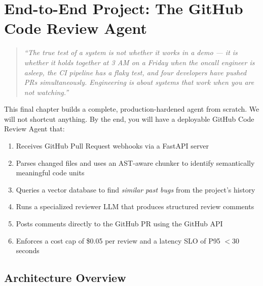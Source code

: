 \chapter{End-to-End Project: The GitHub Code Review Agent}

\begin{quote}
\textit{``The true test of a system is not whether it works in a demo — it is whether it holds together at 3 AM on a Friday when the oncall engineer is asleep, the CI pipeline has a flaky test, and four developers have pushed PRs simultaneously. Engineering is about systems that work when you are not watching.''}
\end{quote}

This final chapter builds a complete, production-hardened agent from scratch. We will not shortcut anything. By the end, you will have a deployable GitHub Code Review Agent that:
\begin{enumerate}
    \item Receives GitHub Pull Request webhooks via a FastAPI server
    \item Parses changed files and uses an AST-aware chunker to identify semantically meaningful code units
    \item Queries a vector database to find \textit{similar past bugs} from the project's history
    \item Runs a specialized reviewer LLM that produces structured review comments
    \item Posts comments directly to the GitHub PR using the GitHub API
    \item Enforces a cost cap of \$0.05 per review and a latency SLO of P95 $< 30$ seconds
\end{enumerate}

\section{Architecture Overview}

